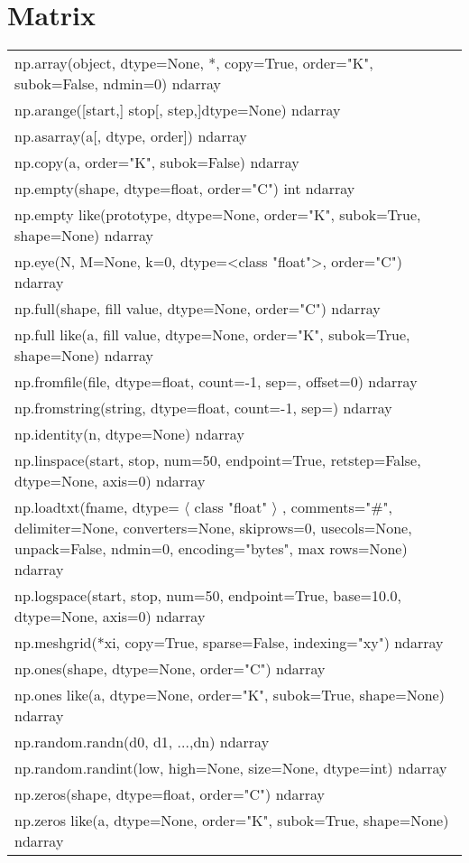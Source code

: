 \section*{Matrix}
\hspace{1cm}
\begin{tabular}{|l|}
	\hline 
	 np.array(object, dtype=None, *, copy=True, order="K", subok=False, ndmin=0) ndarray
	 \\ np.arange([start,] stop[, step,]dtype=None) ndarray
	 \\ np.asarray(a[, dtype, order]) ndarray
	 \\ np.copy(a, order="K", subok=False) ndarray
	 \\ np.empty(shape, dtype=float, order="C") int ndarray
	 \\ np.empty like(prototype, dtype=None, order="K", subok=True, shape=None) ndarray
	 \\ np.eye(N, M=None, k=0, dtype=<class "float">, order="C") ndarray
	 \\ np.full(shape, fill value, dtype=None, order="C") ndarray
	 \\ np.full like(a, fill value, dtype=None, order="K", subok=True, shape=None) ndarray
	 \\ np.fromfile(file, dtype=float, count=-1, sep=, offset=0) ndarray
	 \\ np.fromstring(string, dtype=float, count=-1, sep=) ndarray
	 \\ np.identity(n, dtype=None) ndarray
	 \\ np.linspace(start, stop, num=50, endpoint=True, retstep=False, dtype=None, axis=0) ndarray
	 \\ np.loadtxt(fname, dtype= $\langle$ class "float" $\rangle$ , comments="\#", delimiter=None, converters=None, skiprows=0,  usecols=None, unpack=False, ndmin=0, encoding="bytes", max rows=None) ndarray
	 \\ np.logspace(start, stop, num=50, endpoint=True, base=10.0, dtype=None, axis=0) ndarray
	 \\ np.meshgrid(*xi, copy=True, sparse=False, indexing="xy") ndarray
	 \\ np.ones(shape, dtype=None, order="C") ndarray
	 \\ np.ones like(a, dtype=None, order="K", subok=True, shape=None) ndarray
	 \\ np.random.randn(d0, d1, ...,dn) ndarray
	 \\ np.random.randint(low, high=None, size=None, dtype=int) ndarray
	 \\ np.zeros(shape, dtype=float, order="C") ndarray
	 \\ np.zeros like(a, dtype=None, order="K", subok=True, shape=None) ndarray
	\\\hline
\end{tabular}
